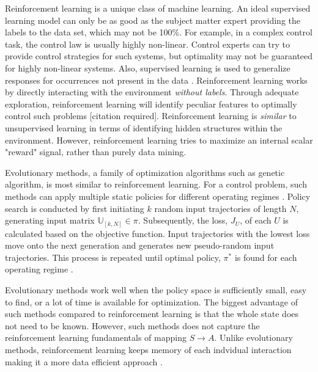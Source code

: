 Reinforcement learning is a unique class of machine learning.  An ideal supervised learning model can only be as good as the subject matter expert providing the labels to the data set, which may not be 100\%.  For example, in a complex control task, the control law is usually highly non-linear. Control experts can try to provide control strategies for such systems, but optimality may not be guaranteed for highly non-linear systems. Also, supervised learning is used to generalize responses for occurrences not present in the data \cite{sutton}.  Reinforcement learning works by directly interacting with the environment \textit{without labels}. Through adequate exploration, reinforcement learning will identify peculiar features to optimally control such problems [citation required].  Reinforcement learning is \textit{similar} to unsupervised learning in terms of identifying hidden structures within the environment.  However, reinforcement learning tries to maximize an internal scalar "reward" signal, rather than purely data mining.

Evolutionary methods, a family of optimization algorithms such as genetic algorithm, is most similar to reinforcement learning.  For a control problem, such methods can apply multiple static policies for different operating regimes \cite{sutton}.  Policy search is conducted by first initiating $k$ random input trajectories of length $N$, generating input matrix $\mathbb{U}_{[k, N]} \in \pi$.  Subsequently, the loss, $J_U$, of each $U$ is calculated based on the objective function.  Input trajectories with the lowest loss move onto the next generation and generates new pseudo-random input trajectories.  This process is repeated until optimal policy, $\pi^*$ is found for each operating regime \cite{ga_for_control}.

Evolutionary methods work well when the policy space is sufficiently small, easy to find, or a lot of time is available for optimization.  The biggest advantage of such methods compared to reinforcement learning is that the whole state does not need to be known.  However, such methods does not capture the reinforcement learning fundamentals of mapping $S \rightarrow A$.  Unlike evolutionary methods, reinforcement learning keeps memory of each indvidual interaction making it a more data efficient approach \cite{sutton}.




